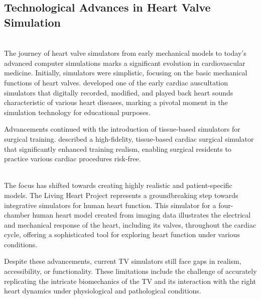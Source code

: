 \subsection{Technological Advances in Heart Valve Simulation}

\\
The journey of heart valve simulators from early mechanical models to today's advanced computer simulations marks a significant evolution in cardiovascular medicine. Initially, simulators were simplistic, focusing on the basic mechanical functions of heart valves.  developed one of the early cardiac auscultation simulators that digitally recorded, modified, and played back heart sounds characteristic of various heart diseases, marking a pivotal moment in the simulation technology for educational purposes.

Advancements continued with the introduction of tissue-based simulators for surgical training.  described a high-fidelity, tissue-based cardiac surgical simulator that significantly enhanced training realism, enabling surgical residents to practice various cardiac procedures risk-free.

\\
The focus has shifted towards creating highly realistic and patient-specific models. The Living Heart Project represents a groundbreaking step towards integrative simulators for human heart function. This simulator for a four-chamber human heart model created from imaging data illustrates the electrical and mechanical response of the heart, including its valves, throughout the cardiac cycle, offering a sophisticated tool for exploring heart function under various conditions. 

Despite these advancements, current \gls{TV} simulators still face gaps in realism, accessibility, or functionality. These limitations include the challenge of accurately replicating the intricate biomechanics of the \gls{TV} and its interaction with the right heart dynamics under physiological and pathological conditions.


